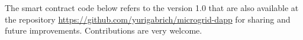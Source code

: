 The smart contract code below refers to the version 1.0 that are also available at the repository \href{https://github.com/yurigabrich/microgrid-dapp}{https://github.com/yurigabrich/microgrid-dapp} for sharing and future improvements. Contributions are very welcome.

% 